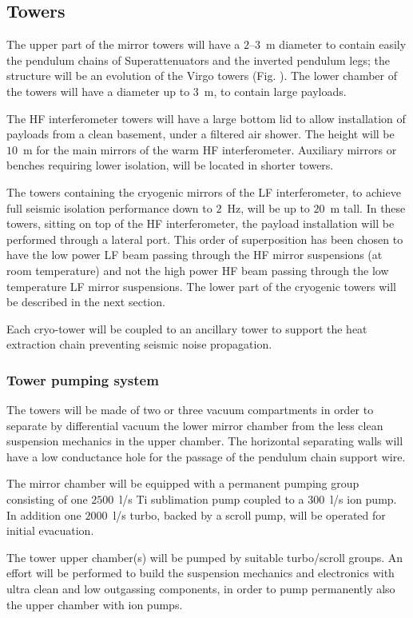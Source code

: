 \subsection{Towers}
The upper part of the mirror towers will have a $2$--$3$~m diameter to contain easily the pendulum chains of Superattenuators and the inverted pendulum legs; the structure will be an evolution of the Virgo towers (Fig. %
). The lower chamber of the towers will have a diameter up to $3$~m, to contain large payloads. 

The HF interferometer towers will have a large bottom lid to allow installation of payloads from a clean basement, under a filtered air shower. The height will be $10$~m for the main mirrors of the warm HF interferometer. Auxiliary mirrors or benches requiring lower isolation, will be located in shorter towers. 

The towers containing the cryogenic mirrors of the LF interferometer, to achieve full seismic isolation performance down to $2$~Hz, will be up to $20$~m tall. In these towers, sitting on top of the HF interferometer, the payload installation will be performed through a lateral port. This order of superposition has been chosen to have the low power LF beam passing through the HF mirror suspensions (at room temperature) and not the high power HF beam passing through the low temperature LF mirror suspensions. The lower part of the cryogenic towers will be described in the next section. 

Each cryo-tower will be coupled to an ancillary tower to support the heat extraction chain preventing seismic noise propagation. 

\subsubsection{Tower pumping system} 
The towers will be made of two or three vacuum compartments in order to separate by differential vacuum the lower mirror chamber from the less clean suspension mechanics in the upper chamber. The horizontal separating walls will have a low conductance hole for the passage of the pendulum chain support wire. 

The mirror chamber will be equipped with a permanent pumping group consisting of one $2500$~l/s Ti sublimation pump coupled to a $300$~l/s ion pump. In addition one $2000$~l/s turbo, backed by a scroll pump, will be operated for initial evacuation. 

The tower upper chamber(s) will be pumped by suitable turbo/scroll groups. An effort will be performed to build the suspension mechanics and electronics with ultra clean and low outgassing components, in order to pump permanently also the upper chamber with ion pumps. 

